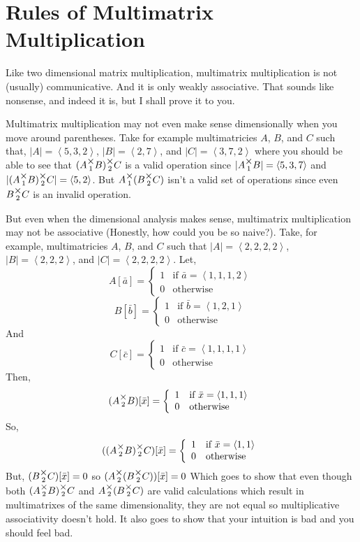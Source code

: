 \documentclass[12pt]{book}
\theoremstyle{plain}
\theoremstyle{definition}
\theoremstyle{ppart}
\theoremstyle{case}
\theoremstyle{solution}
\newcommand{\mmult}[1]{\text{\raisebox{1ex}{$\underset{#1}{\times}$}}}
\begin{document}
\section{Rules of Multimatrix Multiplication}

Like two dimensional matrix multiplication, multimatrix multiplication is
not (usually) communicative. And it is only weakly associative. That sounds like
nonsense, and indeed it is, but I shall prove it to you.

Multimatrix multiplication may not even make sense dimensionally when you move
around parentheses. Take for example multimatricies $A$, $B$, and $C$ such that,
$|A| = \left<5,3,2\right>$,
$|B| = \left<2,7\right>$, and
$|C| = \left<3,7,2\right>$ where you should be able to see that
$(A \mmult{1} B) \mmult{2} C$ is a valid operation since
$|A \mmult{1} B| = \left<5,3,7\right>$ and
$|(A \mmult{1} B) \mmult{2} C| = \left<5,2\right>$. But
$A \mmult{1} (B \mmult{2} C)$ isn't a valid set of operations since even
$B \mmult{2} C$ is an invalid operation.

But even when the dimensional analysis makes sense, multimatrix multiplication
may not be associative (Honestly, how could you be so naive?). 
Take, for example, multimatricies $A$, $B$, and $C$ such
that $|A| = \left<2,2,2,2\right>$, $|B| = \left<2,2,2\right>$, and
$|C| = \left<2,2,2,2\right>$. Let,
\[
 A[\bar{a}] = 
  \left\{
    \begin{array}{ll}
      1 & \mbox{if } \bar{a} = \left<1,1,1,2\right> \\
      0 & \mbox{otherwise}
    \end{array}
  \right.
\]
\[
 B[\bar{b}] = 
  \left\{
    \begin{array}{ll}
      1 & \mbox{if } \bar{b} = \left<1,2,1\right> \\
      0 & \mbox{otherwise}
    \end{array}
  \right.
\]
And
\[
 C[\bar{c}] = 
  \left\{
    \begin{array}{ll}
      1 & \mbox{if } \bar{c} = \left<1,1,1,1\right> \\
      0 & \mbox{otherwise}
    \end{array}
  \right.
\]
Then,
\[
 (A \mmult{2} B)[\bar{x}] = 
  \left\{
    \begin{array}{ll}
      1 & \mbox{if } \bar{x} = \left<1,1,1\right> \\
      0 & \mbox{otherwise}
    \end{array}
  \right.
\]
So,
\[
 ((A \mmult{2} B) \mmult{2} C)[\bar{x}] = 
  \left\{
    \begin{array}{ll}
      1 & \mbox{if } \bar{x} = \left<1,1\right> \\
      0 & \mbox{otherwise}
    \end{array}
  \right.
\]
But, $(B \mmult{2} C)[\bar{x}] = 0$ so $(A \mmult{2} (B \mmult{2} C))[\bar{x}] = 0$
Which goes to show that even though both $(A \mmult{2} B) \mmult{2} C$ and
$A \mmult{2} (B \mmult{2} C)$ are valid calculations which result in multimatrixes
of the same dimensionality, they are not equal so multiplicative associativity
doesn't hold. It also goes to show that your intuition is bad and you should feel bad.
\end{document}
